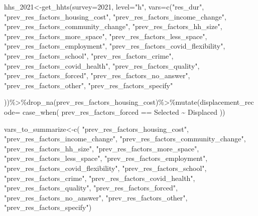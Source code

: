 \documentclass[
]{article}
\newenvironment{Shaded}{\begin{snugshade}}{\end{snugshade}}
\newcommand{\AttributeTok}[1]{\textcolor[rgb]{0.77,0.63,0.00}{#1}}
\newcommand{\FunctionTok}[1]{\textcolor[rgb]{0.00,0.00,0.00}{#1}}
\newcommand{\NormalTok}[1]{#1}
\newcommand{\OtherTok}[1]{\textcolor[rgb]{0.56,0.35,0.01}{#1}}
\newcommand{\SpecialCharTok}[1]{\textcolor[rgb]{0.00,0.00,0.00}{#1}}
\newcommand{\StringTok}[1]{\textcolor[rgb]{0.31,0.60,0.02}{#1}}
\begin{document}
\begin{Shaded}
\begin{Highlighting}[]
\NormalTok{hhs\_2021}\OtherTok{\textless{}{-}}\FunctionTok{get\_hhts}\NormalTok{(}\AttributeTok{survey=}\StringTok{\textquotesingle{}2021\textquotesingle{}}\NormalTok{, }\AttributeTok{level=}\StringTok{"h"}\NormalTok{, }\AttributeTok{vars=}\FunctionTok{c}\NormalTok{(}\StringTok{"res\_dur"}\NormalTok{,}
\StringTok{"prev\_res\_factors\_housing\_cost"}\NormalTok{,}
\StringTok{"prev\_res\_factors\_income\_change"}\NormalTok{,}
\StringTok{"prev\_res\_factors\_community\_change"}\NormalTok{,}
\StringTok{"prev\_res\_factors\_hh\_size"}\NormalTok{,}
\StringTok{"prev\_res\_factors\_more\_space"}\NormalTok{,}
\StringTok{"prev\_res\_factors\_less\_space"}\NormalTok{,}
\StringTok{"prev\_res\_factors\_employment"}\NormalTok{,}
\StringTok{"prev\_res\_factors\_covid\_flexibility"}\NormalTok{,}
\StringTok{"prev\_res\_factors\_school"}\NormalTok{,}
\StringTok{"prev\_res\_factors\_crime"}\NormalTok{,}
\StringTok{"prev\_res\_factors\_covid\_health"}\NormalTok{,}
\StringTok{"prev\_res\_factors\_quality"}\NormalTok{,}
\StringTok{"prev\_res\_factors\_forced"}\NormalTok{,}
\StringTok{"prev\_res\_factors\_no\_answer"}\NormalTok{,}
\StringTok{"prev\_res\_factors\_other"}\NormalTok{,}
\StringTok{"prev\_res\_factors\_specify"}

\NormalTok{))}\SpecialCharTok{\%\textgreater{}\%}\FunctionTok{drop\_na}\NormalTok{(prev\_res\_factors\_housing\_cost)}\SpecialCharTok{\%\textgreater{}\%}\FunctionTok{mutate}\NormalTok{(}\AttributeTok{displacement\_recode=} \FunctionTok{case\_when}\NormalTok{(}
\NormalTok{  prev\_res\_factors\_forced }\SpecialCharTok{==} \StringTok{\textquotesingle{}Selected\textquotesingle{}} \SpecialCharTok{\textasciitilde{}} \StringTok{\textquotesingle{}Displaced\textquotesingle{}}
\NormalTok{))}



\NormalTok{vars\_to\_summarize}\OtherTok{\textless{}{-}}\FunctionTok{c}\NormalTok{(}
\StringTok{"prev\_res\_factors\_housing\_cost"}\NormalTok{,}
\StringTok{"prev\_res\_factors\_income\_change"}\NormalTok{,}
\StringTok{"prev\_res\_factors\_community\_change"}\NormalTok{,}
\StringTok{"prev\_res\_factors\_hh\_size"}\NormalTok{,}
\StringTok{"prev\_res\_factors\_more\_space"}\NormalTok{,}
\StringTok{"prev\_res\_factors\_less\_space"}\NormalTok{,}
\StringTok{"prev\_res\_factors\_employment"}\NormalTok{,}
\StringTok{"prev\_res\_factors\_covid\_flexibility"}\NormalTok{,}
\StringTok{"prev\_res\_factors\_school"}\NormalTok{,}
\StringTok{"prev\_res\_factors\_crime"}\NormalTok{,}
\StringTok{"prev\_res\_factors\_covid\_health"}\NormalTok{,}
\StringTok{"prev\_res\_factors\_quality"}\NormalTok{,}
\StringTok{"prev\_res\_factors\_forced"}\NormalTok{,}
\StringTok{"prev\_res\_factors\_no\_answer"}\NormalTok{,}
\StringTok{"prev\_res\_factors\_other"}\NormalTok{,}
\StringTok{"prev\_res\_factors\_specify"}\NormalTok{)}




\end{Highlighting}
\end{Shaded}
\end{document}
